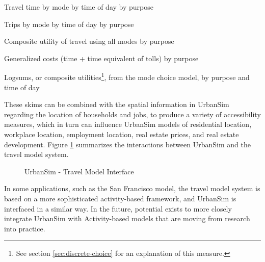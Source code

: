\squishlist
\item   Travel time by mode by time of day by purpose
\item Trips by mode by time of day by purpose
\item   Composite utility of travel using all modes by purpose
\item Generalized costs (time + time equivalent of tolls) by purpose
\item Logsums, or composite utilities\footnote{See section \ref{sec:discrete-choice} for an explanation of this measure.}, from the mode choice model, by purpose and time of day
\squishend

These skims can be combined with the spatial information in UrbanSim regarding the location of households and jobs, to produce
a variety of accessibility measures, which in turn can influence UrbanSim models of residential location, workplace location, employment
location, real estate prices, and real estate development.  Figure \ref{fig:TMinterface} summarizes the interactions between UrbanSim and
the travel model system.

\begin{figure}[ht]
\center {}
\caption{UrbanSim - Travel Model Interface} \label{fig:TMinterface}
\end{figure}

In some applications, such as the San Francisco model, the travel model system is based on a more sophisticated activity-based
framework, and UrbanSim is interfaced in a similar way. In the future, potential exists to more closely integrate UrbanSim with
Activity-based models that are moving from research into practice.


